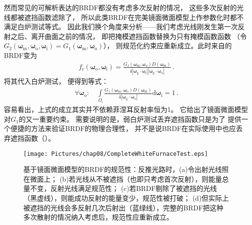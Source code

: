 然而常见的可解析表达的BRDF都没有考虑多次反射的情况，
这些多次反射的光线都被遮挡函数滤除了，
所以此类BRDF在完美镜面微面模型上作参数化时都不满足白炉测试等式。
因此我们换个角度来分析——我们考虑光线刚发生第一次反射之后、离开曲面之前的情况，
即把掩模遮挡函数替换为只有掩模函数函数
（令$G_2({\bm\omega}_{\mathrm{m}},{\bm\omega}_{\mathrm{o}},{\bm\omega}_{\mathrm{i}})
    =G_1({\bm\omega}_{\mathrm{m}},{\bm\omega}_{\mathrm{o}})$），
则规范化约束应重新成立。此时来自的BRDF变为
\begin{align}
    f_{\mathrm{r}}({\bm\omega}_{\mathrm{o}},{\bm\omega}_{\mathrm{i}})
    =\frac{G_1({\bm\omega}_{\mathrm{m}},{\bm\omega}_{\mathrm{o}})D({\bm\omega}_{\mathrm{m}})}
    {4|{\bm\omega}_{\mathrm{g}}\cdot{\bm\omega}_{\mathrm{i}}||{\bm\omega}_{\mathrm{g}}\cdot{\bm\omega}_{\mathrm{o}}|}\, .
\end{align}
将其代入白炉测试，
便得到等式：
\begin{align}\label{eq:08ex01-WeakWhiteFurnaceTest}
    \forall {\bm\omega}_{\mathrm{o}}: \quad\int\limits_{{\varOmega}_{\mathrm{i}}}
    \frac{G_1({\bm\omega}_{\mathrm{m}},{\bm\omega}_{\mathrm{o}})D({\bm\omega}_{\mathrm{m}})}
    {4|{\bm\omega}_{\mathrm{g}}\cdot{\bm\omega}_{\mathrm{o}}|}\mathrm{d}{\bm\omega}_{\mathrm{i}}=1\, .
\end{align}
容易看出，上式的成立其实并不依赖菲涅耳反射率恒为1。
它给出了镜面微面模型对$G_1$的又一重要约束。
需要说明的是，弱白炉测试丢弃遮挡函数只是为了
提供一个便捷的方法来验证BRDF的物理合理性，
并不是说BRDF在实际使用中也应丢弃遮挡函数（）。
\begin{figure}[htbp]
    \centering
    \texttt{[image: Pictures/chap08/CompleteWhiteFurnaceTest.eps]}
    \caption{基于镜面微面模型的BRDF的规范性：反推光路时，(a)令出射光线照在微面上；
    (b)若光线从不被遮挡（也即只考虑首次反射），则能量总量不变，反射光线满足规范性；
    (c)若BRDF剔除了被遮挡的光线（黑虚线），则能成功反射的能量变少，规范性被打破；
    (d)但实际上被遮挡的光线会多反射几次后射出（蓝绿线），完整的BRDF把这种多次散射的情况纳入考虑后，规范性应重新成立。}
    \label{fig:08ex01-CompleteWhiteFurnaceTest}
\end{figure}

